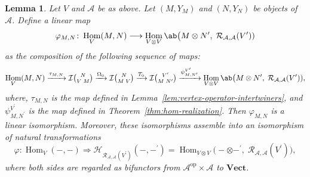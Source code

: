 \documentclass[12pt, english]{article}
\numberwithin{equation}{section}
\DeclareMathOperator{\Hom}{Hom}
\DeclareMathOperator{\opp}{op}
\theoremstyle{plain}
\newtheorem{lemma}{Lemma}[section]
\theoremstyle{definition}
\theoremstyle{remark}
\begin{document}
	\begin{lemma} \label{lem:hom-kernel-realization}
		Let $V$ and $\mathcal{A}$ be as above. Let $(M, Y_M)$ and $(N, Y_N)$ be objects of $\mathcal{A}$.
		Define a linear map
		\[
		\varphi_{M, N} \colon \Hom_V(M, N) \longrightarrow \Hom_{V \otimes V} \ab\big(M \otimes N^\prime, \; \mathcal{R}_{\mathcal{A}, \mathcal{A} }(V^\prime))
		\]
		as the composition of the following sequence of maps:
		\[
		\Hom_V(M, N) \xrightarrow{\tau_{M, N}} \mathcal{I}\tbinom{N}{V\;M} \xrightarrow{\Omega_0} \mathcal{I}\tbinom{N}{M\;V}
		\xrightarrow{T_0} \mathcal{I}\tbinom{V^\prime}{M\;N^\prime}
		\xrightarrow{\psi^{V^\prime}_{M, N^\prime}} \Hom_{V \otimes V} \ab\big(M \otimes N^\prime, \; \mathcal{R}_{\mathcal{A}, \mathcal{A} }(V^\prime)),
		\]
		where, $\tau_{M, N}$ is the map defined in Lemma~\ref{lem:vertex-operator-intertwiners}, and $\psi^{V^\prime}_{M, N^\prime}$ is the map defined in Theorem~\ref{thm:hom-realization}.
		Then $\varphi_{M, N}$ is a linear isomorphism.
		Moreover, these isomorphisms assemble into an isomorphism of natural transformations
		\[
		\varphi \colon \Hom_{V}(-, -) \Rightarrow \mathcal{H}_{\mathcal{R}_{\mathcal{A}, \mathcal{A} }(V^\prime)}(-, -^\prime)=\Hom_{V \otimes V}\big(- \otimes-^\prime, \; \mathcal{R}_{\mathcal{A}, \mathcal{A} }(V^\prime) \big) ,
		\]
		where both sides are regarded as bifunctors from $\mathcal{A}^{\opp} \times \mathcal{A}$ to $\mathbf{Vect}$.
	\end{lemma}
	
\end{document}
